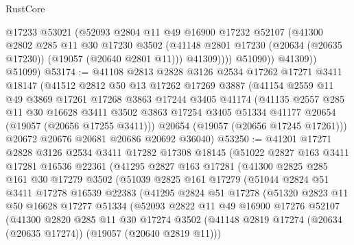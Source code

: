 \begin{lexlean}{RustCore}
\begin{coremodule}
                  @17233
                  @53021
                  (@52093
                    @2804
                    @11
                    @49
                    @16900
                    @17232
                    @52107
                    (@41300
                      @2802
                      @285
                      @11
                      @30
                      @17230
                      @3502
                      (@41148 @2801 @17230 (@20634 (@20635 @17230)) (@19057 (@20640 @2801 @11)))
                      @41309))))
              @51090))
          @41309))
      @51099)
@53174 := @41108
    @2813
    @2828
    @3126
    @2534
    @17262
    @17271
    @3411
    @18147
    (@41512
      @2812
      @50
      @13
      @17262
      @17269
      @3887
      (@41154
        @2559
        @11
        @49
        @3869
        @17261
        @17268
        @3863
        @17244
        @3405
        @41174
        (@41135
          @2557
          @285
          @11
          @30
          @16628
          @3411
          @3502
          @3863
          @17254
          @3405
          @51334
          @41177
          @20654
          (@19057 (@20656 @17255 @3411)))
        @20654
        (@19057 (@20656 @17245 @17261)))
      @20672
      @20676
      @20681
      @20686
      @20692
      @36040)
@53250 := @41201
    @17271
    @2828
    @3126
    @2534
    @3411
    @17282
    @17308
    @18145
    (@51022
      @2827
      @163
      @3411
      @17281
      @16536
      @22361
      (@41295
        @2827
        @163
        @17281
        (@41300
          @2825
          @285
          @161
          @30
          @17279
          @3502
          (@51039
            @2825
            @161
            @17279
            (@51044
              @2824
              @51
              @3411
              @17278
              @16539
              @22383
              (@41295
                @2824
                @51
                @17278
                (@51320
                  @2823
                  @11
                  @50
                  @16628
                  @17277
                  @51334
                  (@52093
                    @2822
                    @11
                    @49
                    @16900
                    @17276
                    @52107
                    (@41300
                      @2820
                      @285
                      @11
                      @30
                      @17274
                      @3502
                      (@41148 @2819 @17274 (@20634 (@20635 @17274)) (@19057 (@20640 @2819 @11)))

\end{coremodule}
\end{lexlean}

